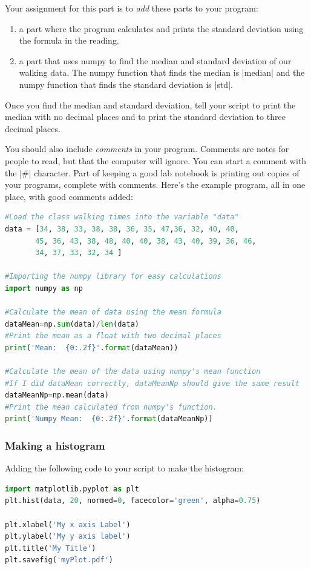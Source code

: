 \documentclass{book}%
\begin{document}
Your assignment for this part is to {\em add} these parts to your program:
\begin{enumerate}
\item a part where the program calculates and prints the standard deviation using the formula in the reading.
\item a part that uses numpy to find the median and standard deviation of our walking data.  The numpy function that finds the median is |median| and the numpy function that finds the standard deviation is |std|.
\end{enumerate}
Once you find the median and standard deviation, tell your script to print the median with no decimal places and to print the standard deviation to three decimal places. 

You should also include {\em comments} in your program.  Comments are notes for people to read, but that the computer will ignore.  You can start a comment with the |\#| character.  Part of keeping a good lab notebook is printing out copies of your programs, complete with comments. Here's the example program, all in one place, with good comments added:
\begin{lstlisting}[language=python]
#Load the class walking times into the variable "data"
data = [34, 38, 33, 38, 38, 36, 35, 47,36, 32, 40, 40, 
       45, 36, 43, 38, 48, 40, 40, 38, 43, 40, 39, 36, 46, 
       34, 37, 33, 32, 34 ]
       
#Importing the numpy library for easy calculations
import numpy as np

#Calculate the mean of data using the mean formula 
dataMean=np.sum(data)/len(data)
#Print the mean as a float with two decimal places
print('Mean:  {0:.2f}'.format(dataMean))

#Calculate the mean of the data using numpy's mean function
#If I did dataMean correctly, dataMeanNp should give the same result
dataMeanNp=np.mean(data)
#Print the mean calculated from numpy's function.  
print('Numpy Mean:  {0:.2f}'.format(dataMeanNp))
\end{lstlisting}

\subsubsection{Making a histogram}

Adding the following code to your script to make the histogram:

\begin{lstlisting}[language=python]
import matplotlib.pyplot as plt
plt.hist(data, 20, normed=0, facecolor='green', alpha=0.75)

plt.xlabel('My x axis Label')
plt.ylabel('My y axis label')
plt.title('My Title')
plt.savefig('myPlot.pdf')
\end{lstlisting}
\end{document}

